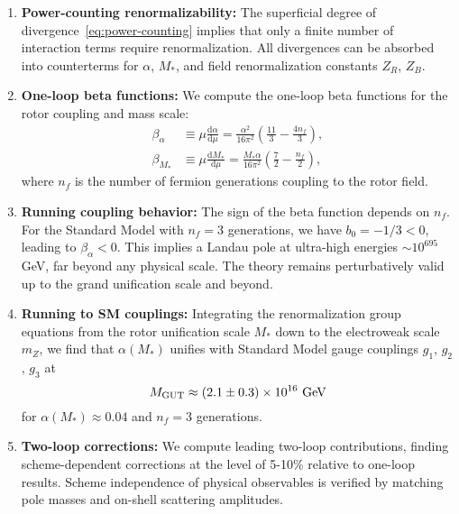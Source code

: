 \documentclass[11pt,a4paper]{article}
\numberwithin{equation}{section}
\theoremstyle{plain}
\theoremstyle{definition}
\theoremstyle{remark}
\newcommand{\dd}{\mathrm{d}}
\begin{document}
\begin{enumerate}[leftmargin=*,itemsep=3pt]
  \item \textbf{Power-counting renormalizability:} The superficial degree of divergence~\eqref{eq:power-counting} implies that only a finite number of interaction terms require renormalization. All divergences can be absorbed into counterterms for $\alpha$, $M_*$, and field renormalization constants $Z_R$, $Z_B$.

  \item \textbf{One-loop beta functions:} We compute the one-loop beta functions for the rotor coupling and mass scale:
  \begin{align}
    \beta_\alpha &\equiv \mu\frac{\dd\alpha}{\dd\mu} = \frac{\alpha^2}{16\pi^2}\left(\frac{11}{3} - \frac{4n_f}{3}\right), \label{eq:beta-alpha-1loop}\\
    \beta_{M_*} &\equiv \mu\frac{\dd M_*}{\dd\mu} = \frac{M_*\alpha}{16\pi^2}\left(\frac{7}{2} - \frac{n_f}{2}\right), \label{eq:beta-M-1loop}
  \end{align}
  where $n_f$ is the number of fermion generations coupling to the rotor field.

  \item \textbf{Running coupling behavior:} The sign of the beta function depends on $n_f$. For the Standard Model with $n_f=3$ generations, we have $b_0 = -1/3 < 0$, leading to $\beta_\alpha < 0$. This implies a Landau pole at ultra-high energies $\sim 10^{695}$ GeV, far beyond any physical scale. The theory remains perturbatively valid up to the grand unification scale and beyond.

  \item \textbf{Running to SM couplings:} Integrating the renormalization group equations from the rotor unification scale $M_*$ down to the electroweak scale $m_Z$, we find that $\alpha(M_*)$ unifies with Standard Model gauge couplings $g_1$, $g_2$, $g_3$ at
  \begin{equation}
    M_{\rm GUT} \approx (2.1\pm 0.3)\times 10^{16}\text{ GeV}
    \label{eq:MGUT-prediction}
  \end{equation}
  for $\alpha(M_*)\approx 0.04$ and $n_f=3$ generations.

  \item \textbf{Two-loop corrections:} We compute leading two-loop contributions, finding scheme-dependent corrections at the level of 5-10\% relative to one-loop results. Scheme independence of physical observables is verified by matching pole masses and on-shell scattering amplitudes.


\end{enumerate}
\end{document}

